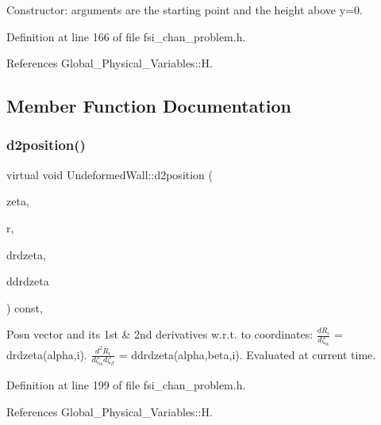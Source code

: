 Constructor\+: arguments are the starting point and the height above y=0. 



Definition at line 166 of file fsi\+\_\+chan\+\_\+problem.\+h.



References Global\+\_\+\+Physical\+\_\+\+Variables\+::H.



\subsection{Member Function Documentation}
\mbox{\label{classUndeformedWall_a709e65fc95e9443a886125e455595e5d}} 
\subsubsection{\texorpdfstring{d2position()}{d2position()}}
{\footnotesize\ttfamily virtual void Undeformed\+Wall\+::d2position (\begin{DoxyParamCaption}\item[{const Vector$<$ double $>$ \&}]{zeta,  }\item[{Vector$<$ double $>$ \&}]{r,  }\item[{Dense\+Matrix$<$ double $>$ \&}]{drdzeta,  }\item[{Rank\+Three\+Tensor$<$ double $>$ \&}]{ddrdzeta }\end{DoxyParamCaption}) const\hspace{0.3cm}{\ttfamily [inline]}, {\ttfamily [virtual]}}



Posn vector and its 1st \& 2nd derivatives w.\+r.\+t. to coordinates\+: $ \frac{dR_i}{d \zeta_\alpha}$ = drdzeta(alpha,i). $ \frac{d^2R_i}{d \zeta_\alpha d \zeta_\beta}$ = ddrdzeta(alpha,beta,i). Evaluated at current time. 



Definition at line 199 of file fsi\+\_\+chan\+\_\+problem.\+h.



References Global\+\_\+\+Physical\+\_\+\+Variables\+::H.

\mbox{\label{classUndeformedWall_ab0410681e2096091319a79e79937cba3}} 
